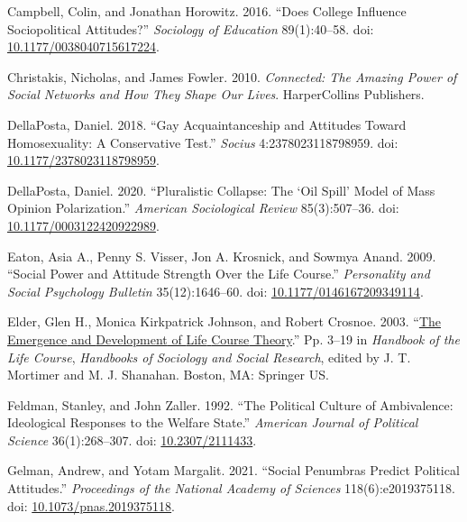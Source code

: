\documentclass[
  12pt,
]{article}
\newlength{\cslhangindent}
\newlength{\cslentryspacingunit} %
\newenvironment{CSLReferences}[2] %
 {%
  \setlength{\parindent}{0pt}
  \ifodd #1
  \let\oldpar\par
  \def\par{\hangindent=\cslhangindent\oldpar}
  \fi
  \setlength{\parskip}{#2\cslentryspacingunit}
 }%
 {}
\begin{document}
\begin{CSLReferences}{1}{0}
\leavevmode{}%
Campbell, Colin, and Jonathan Horowitz. 2016. {``Does {College}
{Influence} {Sociopolitical} {Attitudes}?''} \emph{Sociology of
Education} 89(1):40--58. doi:
\href{https://doi.org/10.1177/0038040715617224}{10.1177/0038040715617224}.

\leavevmode{}%
Christakis, Nicholas, and James Fowler. 2010. \emph{Connected: {The}
{Amazing} {Power} of {Social} {Networks} and {How} {They} {Shape} {Our}
{Lives}}. HarperCollins Publishers.

\leavevmode{}%
DellaPosta, Daniel. 2018. {``Gay {Acquaintanceship} and {Attitudes}
Toward {Homosexuality}: {A} {Conservative} {Test}.''} \emph{Socius}
4:2378023118798959. doi:
\href{https://doi.org/10.1177/2378023118798959}{10.1177/2378023118798959}.

\leavevmode{}%
DellaPosta, Daniel. 2020. {``Pluralistic {Collapse}: {The} {`{Oil}
{Spill}'} {Model} of {Mass} {Opinion} {Polarization}.''} \emph{American
Sociological Review} 85(3):507--36. doi:
\href{https://doi.org/10.1177/0003122420922989}{10.1177/0003122420922989}.

\leavevmode{}%
Eaton, Asia A., Penny S. Visser, Jon A. Krosnick, and Sowmya Anand.
2009. {``Social {Power} and {Attitude} {Strength} {Over} the {Life}
{Course}.''} \emph{Personality and Social Psychology Bulletin}
35(12):1646--60. doi:
\href{https://doi.org/10.1177/0146167209349114}{10.1177/0146167209349114}.

\leavevmode{}%
Elder, Glen H., Monica Kirkpatrick Johnson, and Robert Crosnoe. 2003.
{``\href{https://doi.org/10.1007/978-0-306-48247-2_1}{The {Emergence}
and {Development} of {Life} {Course} {Theory}}.''} Pp. 3--19 in
\emph{Handbook of the {Life} {Course}}, \emph{Handbooks of {Sociology}
and {Social} {Research}}, edited by J. T. Mortimer and M. J. Shanahan.
Boston, MA: Springer US.

\leavevmode{}%
Feldman, Stanley, and John Zaller. 1992. {``The {Political} {Culture} of
{Ambivalence}: {Ideological} {Responses} to the {Welfare} {State}.''}
\emph{American Journal of Political Science} 36(1):268--307. doi:
\href{https://doi.org/10.2307/2111433}{10.2307/2111433}.

\leavevmode{}%
Gelman, Andrew, and Yotam Margalit. 2021. {``Social Penumbras Predict
Political Attitudes.''} \emph{Proceedings of the National Academy of
Sciences} 118(6):e2019375118. doi:
\href{https://doi.org/10.1073/pnas.2019375118}{10.1073/pnas.2019375118}.


\end{CSLReferences}
\end{document}
